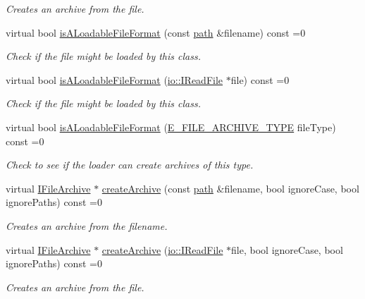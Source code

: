 \begin{DoxyCompactItemize}
\begin{DoxyCompactList}\small\item\em Creates an archive from the file. \end{DoxyCompactList}\item 
virtual bool \hyperlink{classirr_1_1io_1_1IArchiveLoader_a9835ccbfd2c261edf4a738421c488ce3}{is\+A\+Loadable\+File\+Format} (const \hyperlink{namespaceirr_1_1io_a6468281622ce3a1c46b72e19f32dded5}{path} \&filename) const =0
\begin{DoxyCompactList}\small\item\em Check if the file might be loaded by this class. \end{DoxyCompactList}\item 
virtual bool \hyperlink{classirr_1_1io_1_1IArchiveLoader_acda22c3c2a5268665a4a4cf17379931b}{is\+A\+Loadable\+File\+Format} (\hyperlink{classirr_1_1io_1_1IReadFile}{io\+::\+I\+Read\+File} $\ast$file) const =0
\begin{DoxyCompactList}\small\item\em Check if the file might be loaded by this class. \end{DoxyCompactList}\item 
virtual bool \hyperlink{classirr_1_1io_1_1IArchiveLoader_af60c081f27ab941702a4a32dfe482c05}{is\+A\+Loadable\+File\+Format} (\hyperlink{namespaceirr_1_1io_adb3e3c445ec8e608ed1f0f93306da14f}{E\+\_\+\+F\+I\+L\+E\+\_\+\+A\+R\+C\+H\+I\+V\+E\+\_\+\+T\+Y\+PE} file\+Type) const =0
\begin{DoxyCompactList}\small\item\em Check to see if the loader can create archives of this type. \end{DoxyCompactList}\item 
virtual \hyperlink{classirr_1_1io_1_1IFileArchive}{I\+File\+Archive} $\ast$ \hyperlink{classirr_1_1io_1_1IArchiveLoader_a55e9586f190588e5fea6d17f63fb7aad}{create\+Archive} (const \hyperlink{namespaceirr_1_1io_a6468281622ce3a1c46b72e19f32dded5}{path} \&filename, bool ignore\+Case, bool ignore\+Paths) const =0
\begin{DoxyCompactList}\small\item\em Creates an archive from the filename. \end{DoxyCompactList}\item 
virtual \hyperlink{classirr_1_1io_1_1IFileArchive}{I\+File\+Archive} $\ast$ \hyperlink{classirr_1_1io_1_1IArchiveLoader_acd4a78189c62db96e4e10aa89c934980}{create\+Archive} (\hyperlink{classirr_1_1io_1_1IReadFile}{io\+::\+I\+Read\+File} $\ast$file, bool ignore\+Case, bool ignore\+Paths) const =0
\begin{DoxyCompactList}\small\item\em Creates an archive from the file. \end{DoxyCompactList}\end{DoxyCompactItemize}
